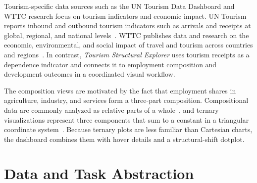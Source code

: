 \documentclass{vgtc}
\begin{document}
Tourism-specific data sources such as the UN Tourism Data Dashboard and WTTC research focus on tourism indicators and economic impact. UN Tourism reports inbound and outbound tourism indicators such as arrivals and receipts at global, regional, and national levels~\cite{untourism_dashboard}. WTTC publishes data and research on the economic, environmental, and social impact of travel and tourism across countries and regions~\cite{wttc_research}. In contrast, \emph{Tourism Structural Explorer} uses tourism receipts as a dependence indicator and connects it to employment composition and development outcomes in a coordinated visual workflow.

The composition views are motivated by the fact that employment shares in agriculture, industry, and services form a three-part composition. Compositional data are commonly analyzed as relative parts of a whole~\cite{aitchison1986}, and ternary visualizations represent three components that sum to a constant in a triangular coordinate system~\cite{schoeley2021}. Because ternary plots are less familiar than Cartesian charts, the dashboard combines them with hover details and a structural-shift dotplot.

\section{Data and Task Abstraction}
\end{document}
